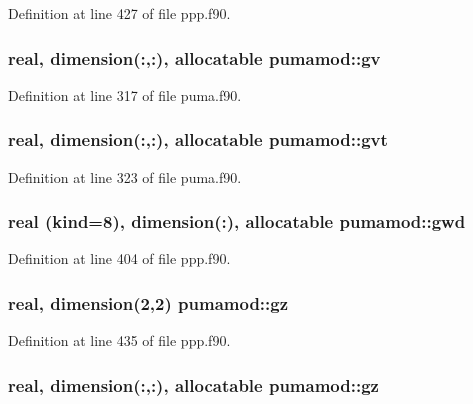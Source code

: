 \-Definition at line 427 of file ppp.\-f90.

\hypertarget{classpumamod_a88b0140b2435578aa69cb4ac9781b91c}{
\subsubsection[{gv}]{\setlength{\rightskip}{0pt plus 5cm}real, dimension(\-:,\-:), allocatable {\bf pumamod\-::gv}}}
\label{classpumamod_a88b0140b2435578aa69cb4ac9781b91c}


\-Definition at line 317 of file puma.\-f90.

\hypertarget{classpumamod_a1b9d24404ad1e089ee401e7c00ec79f0}{
\subsubsection[{gvt}]{\setlength{\rightskip}{0pt plus 5cm}real, dimension(\-:,\-:), allocatable {\bf pumamod\-::gvt}}}
\label{classpumamod_a1b9d24404ad1e089ee401e7c00ec79f0}


\-Definition at line 323 of file puma.\-f90.

\hypertarget{classpumamod_af7724a88a5fba5e0ea4a278eca324b7b}{
\subsubsection[{gwd}]{\setlength{\rightskip}{0pt plus 5cm}real (kind=8), dimension(\-:), allocatable {\bf pumamod\-::gwd}}}
\label{classpumamod_af7724a88a5fba5e0ea4a278eca324b7b}


\-Definition at line 404 of file ppp.\-f90.

\hypertarget{classpumamod_a0e0c4c718b441b61b728ccb5b97b8184}{
\subsubsection[{gz}]{\setlength{\rightskip}{0pt plus 5cm}real, dimension(2,2) {\bf pumamod\-::gz}}}
\label{classpumamod_a0e0c4c718b441b61b728ccb5b97b8184}


\-Definition at line 435 of file ppp.\-f90.

\hypertarget{classpumamod_af24b389b45d2a20b68ea5bfc7cc48d17}{
\subsubsection[{gz}]{\setlength{\rightskip}{0pt plus 5cm}real, dimension(\-:,\-:), allocatable {\bf pumamod\-::gz}}}
\label{classpumamod_af24b389b45d2a20b68ea5bfc7cc48d17}


